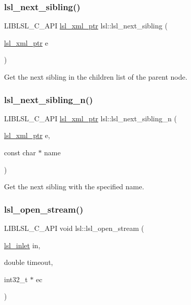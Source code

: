 \subsubsection{\texorpdfstring{lsl\+\_\+next\+\_\+sibling()}{lsl\_next\_sibling()}}
{\footnotesize\ttfamily L\+I\+B\+L\+S\+L\+\_\+\+C\+\_\+\+A\+PI \hyperlink{namespacelsl_a5edc7a49a1a1be1634fe6dce3d59c59b}{lsl\+\_\+xml\+\_\+ptr} lsl\+::lsl\+\_\+next\+\_\+sibling (\begin{DoxyParamCaption}\item[{\hyperlink{namespacelsl_a5edc7a49a1a1be1634fe6dce3d59c59b}{lsl\+\_\+xml\+\_\+ptr}}]{e }\end{DoxyParamCaption})}

Get the next sibling in the children list of the parent node. \mbox{\label{namespacelsl_ac898e643d9e43785030c3e1a7524ea70}} 
\subsubsection{\texorpdfstring{lsl\+\_\+next\+\_\+sibling\+\_\+n()}{lsl\_next\_sibling\_n()}}
{\footnotesize\ttfamily L\+I\+B\+L\+S\+L\+\_\+\+C\+\_\+\+A\+PI \hyperlink{namespacelsl_a5edc7a49a1a1be1634fe6dce3d59c59b}{lsl\+\_\+xml\+\_\+ptr} lsl\+::lsl\+\_\+next\+\_\+sibling\+\_\+n (\begin{DoxyParamCaption}\item[{\hyperlink{namespacelsl_a5edc7a49a1a1be1634fe6dce3d59c59b}{lsl\+\_\+xml\+\_\+ptr}}]{e,  }\item[{const char $\ast$}]{name }\end{DoxyParamCaption})}

Get the next sibling with the specified name. \mbox{\label{namespacelsl_ad72aa9d01ea937b413adf615322ce9a7}} 
\subsubsection{\texorpdfstring{lsl\+\_\+open\+\_\+stream()}{lsl\_open\_stream()}}
{\footnotesize\ttfamily L\+I\+B\+L\+S\+L\+\_\+\+C\+\_\+\+A\+PI void lsl\+::lsl\+\_\+open\+\_\+stream (\begin{DoxyParamCaption}\item[{\hyperlink{namespacelsl_a884a3363cfcba75d7ce8f00c1c4c54f1}{lsl\+\_\+inlet}}]{in,  }\item[{double}]{timeout,  }\item[{int32\+\_\+t $\ast$}]{ec }\end{DoxyParamCaption})}

